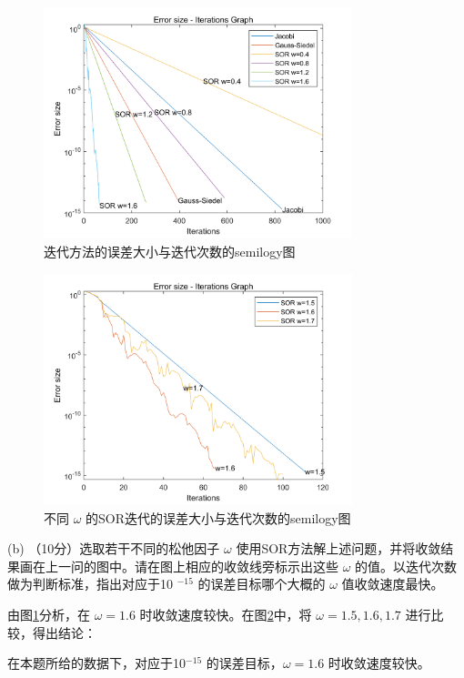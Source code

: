\documentclass[12pt,a4paper,UTF8]{ctexart}
\begin{document}
\begin{enumerate}
          \begin{figure}[H]
              \centering
              \includegraphics[width=0.8\textwidth]{q.png}
              \caption{迭代方法的误差大小与迭代次数的semilogy图}\label{4}
          \end{figure}
          \begin{figure}[H]
              \centering
              \includegraphics[width=0.8\textwidth]{2.png}
              \caption{不同 $\omega$ 的SOR迭代的误差大小与迭代次数的semilogy图}\label{sor}
          \end{figure}
          (b) （10分）选取若干不同的松他因子 $\omega$ 使用SOR方法解上述问题，并将收敛结果画在上一问的图中。请在图上相应的收敛线旁标示出这些 $\omega$ 的值。以迭代次数做为判断标准，指出对应于10 $^{-15}$ 的误差目标哪个大概的 $\omega$ 值收敛速度最快。

          由图\ref{4}分析，在 $\omega = 1.6$ 时收敛速度较快。在图\ref{sor}中，将 $\omega = 1.5, 1.6, 1.7$ 进行比较，得出结论：

          在本题所给的数据下，对应于10$^{-15}$ 的误差目标，$\omega = 1.6$ 时收敛速度较快。


\end{enumerate}
\end{document}

